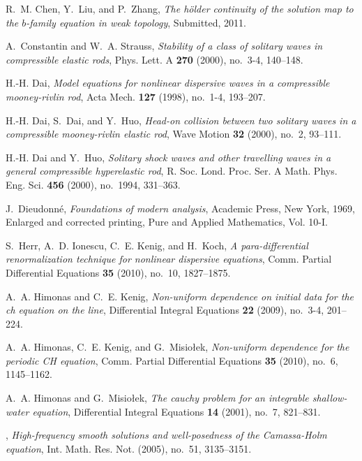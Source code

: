 \documentclass[final,noinfo]{thesis}
\numberwithin{equation}{section}
\begin{document}
\begin{thebibliography}{100}
R.~M. Chen, Y.~Liu, and P.~Zhang, \emph{The h\"{o}lder continuity of the
  solution map to the $b$-family equation in weak topology}, Submitted, 2011.

A.~Constantin and W.~A. Strauss, \emph{Stability of a class of solitary waves
  in compressible elastic rods}, Phys. Lett. A \textbf{270} (2000), no.~3-4,
  140--148.

H.-H. Dai, \emph{Model equations for nonlinear dispersive waves in a
  compressible mooney-rivlin rod}, Acta Mech. \textbf{127} (1998), no.~1-4,
  193--207.

H.-H. Dai, S.~Dai, and Y.~Huo, \emph{Head-on collision between two solitary
  waves in a compressible mooney-rivlin elastic rod}, Wave Motion \textbf{32}
  (2000), no.~2, 93--111.

H.-H. Dai and Y.~Huo, \emph{Solitary shock waves and other travelling waves in
  a general compressible hyperelastic rod}, R. Soc. Lond. Proc. Ser. A Math.
  Phys. Eng. Sci. \textbf{456} (2000), no.~1994, 331--363.

J.~Dieudonn{{\'e}}, \emph{Foundations of modern analysis}, Academic Press, New
  York, 1969, Enlarged and corrected printing, Pure and Applied Mathematics,
  Vol. 10-I. 

S.~Herr, A.~D. Ionescu, C.~E. Kenig, and H.~Koch, \emph{A para-differential
  renormalization technique for nonlinear dispersive equations}, Comm. Partial
  Differential Equations \textbf{35} (2010), no.~10, 1827--1875.

A.~A. Himonas and C.~E. Kenig, \emph{Non-uniform dependence on initial data for
  the ch equation on the line}, Differential Integral Equations \textbf{22}
  (2009), no.~3-4, 201--224.

A.~A. Himonas, C.~E. Kenig, and G.~Misio{\l}ek, \emph{Non-uniform dependence
  for the periodic {CH} equation}, Comm. Partial Differential Equations
  \textbf{35} (2010), no.~6, 1145--1162. 

A.~A. Himonas and G.~Misio{\l}ek, \emph{The cauchy problem for an integrable
  shallow-water equation}, Differential Integral Equations \textbf{14} (2001),
  no.~7, 821--831.

\bysame, \emph{High-frequency smooth solutions and
  well-posedness of the {C}amassa-{H}olm equation}, Int. Math. Res. Not.
  (2005), no.~51, 3135--3151. 


\end{thebibliography}
\end{document}
